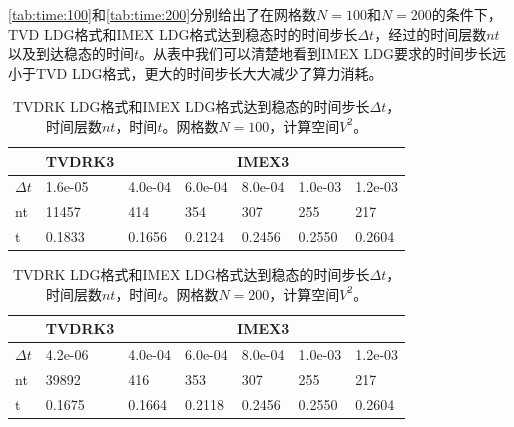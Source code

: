 \autoref{tab:time:100}和\autoref{tab:time:200}分别给出了在网格数$N=100$和$N=200$的条件下，TVD LDG格式和IMEX LDG格式达到稳态时的时间步长$\Delta t$，经过的时间层数$nt$以及到达稳态的时间$t$。从表中我们可以清楚地看到IMEX LDG要求的时间步长远小于TVD LDG格式，更大的时间步长大大减少了算力消耗。
\begin{table}
    \centering
    \begin{tabularx}{\textwidth}{@{} *7{X} @{}}
        \toprule
                   & \multicolumn{1}{c}{TVDRK3} & \multicolumn{5}{c}{IMEX3}                                         \\
        \cmidrule(lr){2-2} \cmidrule(lr){3-7}
        \midrule
        $\Delta t$ & 1.6e-05                    & 4.0e-04                   & 6.0e-04 & 8.0e-04 & 1.0e-03 & 1.2e-03 \\
        nt         & 11457                      & 414                       & 354     & 307     & 255     & 217     \\
        t          & 0.1833                     & 0.1656                    & 0.2124  & 0.2456  & 0.2550  & 0.2604  \\
        \bottomrule
    \end{tabularx}
    \caption{TVDRK LDG格式和IMEX LDG格式达到稳态的时间步长$\Delta t$，时间层数$nt$，时间$t$。网格数$N=100$，计算空间$V^2$。}
    \label{tab:time:100}
\end{table}
\begin{table}
    \begin{tabularx}{\textwidth}{@{} *7{X} @{}}
        \toprule
                   & \multicolumn{1}{c}{TVDRK3} & \multicolumn{5}{c}{IMEX3}                                         \\
        \cmidrule(lr){2-2} \cmidrule(lr){3-7}
        \midrule
        $\Delta t$ & 4.2e-06                    & 4.0e-04                   & 6.0e-04 & 8.0e-04 & 1.0e-03 & 1.2e-03 \\
        nt         & 39892                      & 416                       & 353     & 307     & 255     & 217     \\
        t          & 0.1675                     & 0.1664                    & 0.2118  & 0.2456  & 0.2550  & 0.2604  \\
        \bottomrule
    \end{tabularx}
    \caption{TVDRK LDG格式和IMEX LDG格式达到稳态的时间步长$\Delta t$，时间层数$nt$，时间$t$。网格数$N=200$，计算空间$V^2$。}
    \label{tab:time:200}
\end{table}

